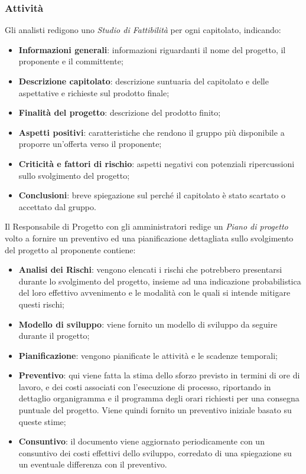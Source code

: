 		\subsubsection{Attività}
		    Gli analisti redigono uno \textit{Studio di Fattibilità} per ogni capitolato, indicando:
		    \begin{itemize}
		        \item \textbf{Informazioni generali}: informazioni riguardanti il nome del progetto, il proponente e il committente;
		        \item \textbf{Descrizione capitolato}: descrizione suntuaria del capitolato e delle aspettative e richieste sul prodotto finale;
		        \item \textbf{Finalità del progetto}: descrizione del prodotto finito;
		        \item \textbf{Aspetti positivi}: caratteristiche che rendono il gruppo più disponibile a proporre un'offerta verso il proponente;
		        \item \textbf{Criticità e fattori di rischio}: aspetti negativi con potenziali ripercussioni sullo svolgimento del progetto;
		        \item \textbf{Conclusioni}: breve spiegazione sul perché il capitolato è stato scartato o accettato dal gruppo.
		    \end{itemize}
			Il Responsabile di Progetto con gli amministratori redige un \textit{Piano di progetto} volto a fornire un preventivo ed una pianificazione dettagliata sullo svolgimento del progetto al proponente contiene:
			\begin{itemize}
			    \item \textbf{Analisi dei Rischi}: vengono elencati i rischi che potrebbero presentarsi durante lo svolgimento del progetto, insieme ad una indicazione probabilistica del loro effettivo avvenimento e le modalità con le quali si intende mitigare questi rischi;
			    \item \textbf{Modello di sviluppo}: viene fornito un modello di sviluppo da seguire durante il progetto;
			    \item \textbf{Pianificazione}: vengono pianificate le attività e le scadenze temporali;
			    \item \textbf{Preventivo}: qui viene fatta la stima dello sforzo previsto in termini di ore di lavoro, e dei costi associati con l'esecuzione di processo, riportando in dettaglio organigramma e il programma degli orari richiesti per una consegna puntuale del progetto. Viene quindi fornito un preventivo iniziale basato su queste stime;
			    \item \textbf{Consuntivo}: il documento viene aggiornato periodicamente con un consuntivo dei costi effettivi dello sviluppo, corredato di una spiegazione su un eventuale differenza con il preventivo.
			\end{itemize}
